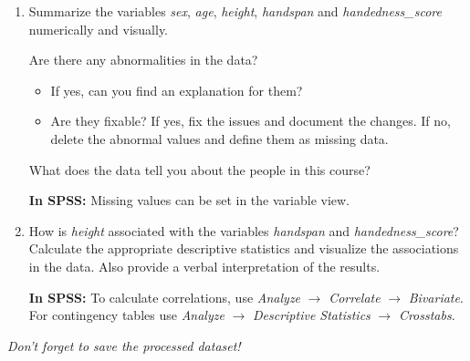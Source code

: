 \documentclass[a4paper, fleqn]{article}
\begin{document}
\begin{enumerate}
  \vspace{1em}
  \item Summarize the variables \textit{sex}, \textit{age}, \textit{height}, \textit{handspan} and \textit{handedness\_score} numerically and visually. 
  
  \vspace{0.5em}
  Are there any abnormalities in the data? 
  \begin{itemize}
    \item If yes, can you find an explanation for them?
    \item Are they fixable? If yes, fix the issues and document the changes. If no, delete the abnormal values and define them as missing data. 
  \end{itemize}
  What does the data tell you about the people in this course?  

\vspace{0.5em}
\textbf{In SPSS:} Missing values can be set in the variable view. 

  \vspace{1em}
\item How is \textit{height} associated with the variables \textit{handspan} and \textit{handedness\_score}? Calculate the appropriate descriptive statistics and visualize the associations in the data. Also provide a verbal interpretation of the results.

\vspace{0.5em}
\textbf{In SPSS:} To calculate correlations, use \textit{Analyze} $\rightarrow$ \textit{Correlate} $\rightarrow$ \textit{Bivariate}. For contingency tables use \textit{Analyze} $\rightarrow$ \textit{Descriptive Statistics} $\rightarrow$ \textit{Crosstabs}.

\end{enumerate}

\vspace{2em}
\textit{Don't forget to save the processed dataset!}
\end{document}
